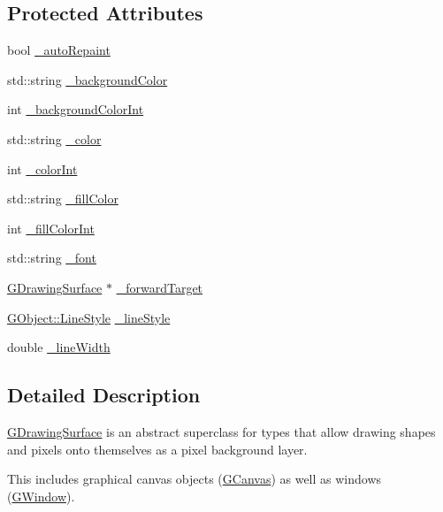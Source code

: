 \subsection*{Protected Attributes}
\begin{DoxyCompactItemize}
\item 
bool \mbox{\hyperlink{classGDrawingSurface_a738dd6afc69ac536ad46cf4d89a90933}{\+\_\+auto\+Repaint}}
\item 
std\+::string \mbox{\hyperlink{classGDrawingSurface_ad233544ea51cf6b435a199f3e3790607}{\+\_\+background\+Color}}
\item 
int \mbox{\hyperlink{classGDrawingSurface_abb8452ab4f23ecf455b9e021bf09ef91}{\+\_\+background\+Color\+Int}}
\item 
std\+::string \mbox{\hyperlink{classGDrawingSurface_a1134e770ae4315ea8bc1201e2f21da8b}{\+\_\+color}}
\item 
int \mbox{\hyperlink{classGDrawingSurface_a003fdd343d9b7505c53a8b7a134200ed}{\+\_\+color\+Int}}
\item 
std\+::string \mbox{\hyperlink{classGDrawingSurface_a179f8d6cee65cd8a54692e32b224392a}{\+\_\+fill\+Color}}
\item 
int \mbox{\hyperlink{classGDrawingSurface_a751def333a67d651e5b99cc331ecb496}{\+\_\+fill\+Color\+Int}}
\item 
std\+::string \mbox{\hyperlink{classGDrawingSurface_aea76ea1a8b5dd7b0a78653277e63b536}{\+\_\+font}}
\item 
\mbox{\hyperlink{classGDrawingSurface}{G\+Drawing\+Surface}} $\ast$ \mbox{\hyperlink{classGDrawingSurface_acbb02fa2a4a51a450fd1cc64dfc39ddd}{\+\_\+forward\+Target}}
\item 
\mbox{\hyperlink{classGObject_a86e0f5648542856159bb40775c854aa7}{G\+Object\+::\+Line\+Style}} \mbox{\hyperlink{classGDrawingSurface_ae15d02c66691247a6824dc5943a620e2}{\+\_\+line\+Style}}
\item 
double \mbox{\hyperlink{classGDrawingSurface_a16e9033665937f13de2e163dc2184aff}{\+\_\+line\+Width}}
\end{DoxyCompactItemize}


\subsection{Detailed Description}
\mbox{\hyperlink{classGDrawingSurface}{G\+Drawing\+Surface}} is an abstract superclass for types that allow drawing shapes and pixels onto themselves as a pixel background layer. 

This includes graphical canvas objects (\mbox{\hyperlink{classGCanvas}{G\+Canvas}}) as well as windows (\mbox{\hyperlink{classGWindow}{G\+Window}}). 

